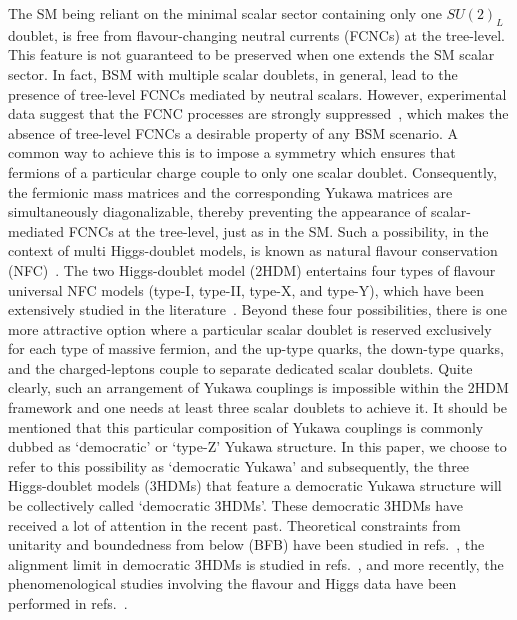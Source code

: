 \documentclass[11pt]{article}
\begin{document}
The SM being reliant on the minimal scalar sector containing only one $SU(2)_L$ doublet, is free from flavour-changing neutral currents (FCNCs) at the tree-level.  
This feature is not guaranteed to be preserved when one extends the SM scalar sector.  
In fact, BSM with multiple scalar doublets, in general, lead to the presence of tree-level FCNCs mediated by neutral scalars.  
However, experimental data suggest that the FCNC processes are strongly suppressed~\cite{Workman:2022ynf}, which makes the absence of tree-level FCNCs a desirable property of any BSM scenario.  
A common way to achieve this is to impose a symmetry which ensures that fermions of a particular charge couple to only one scalar doublet.  
Consequently, the fermionic mass matrices and the corresponding Yukawa matrices are simultaneously diagonalizable, thereby preventing the appearance of scalar-mediated FCNCs at the tree-level, just as in the SM.  
Such a possibility, in the context of multi Higgs-doublet models, is known as natural flavour conservation (NFC)~\cite{Glashow:1976nt}.  
The two Higgs-doublet model (2HDM) entertains four types of flavour universal NFC models (type-I, type-II, type-X, and type-Y), which have been extensively studied in the literature~\cite{Branco:2011iw}.  
Beyond these four possibilities, there is one more attractive option where a particular scalar doublet is reserved exclusively for each type of massive fermion, and the up-type quarks, the down-type quarks, and the charged-leptons couple to separate dedicated scalar doublets.  
Quite clearly, such an arrangement of Yukawa couplings is impossible within the 2HDM framework and one needs at least three scalar doublets to achieve it.  
It should be mentioned that this particular composition of Yukawa couplings is commonly dubbed as `democratic'\cite{Cree:2011uy} or `type-Z'\cite{Akeroyd:2016ssd} Yukawa structure.  
In this paper, we choose to refer to this possibility as `democratic Yukawa' and subsequently, the three Higgs-doublet models (3HDMs) that feature a democratic Yukawa structure will be collectively called `democratic 3HDMs'.  
These democratic 3HDMs have received a lot of attention in the recent past.  
Theoretical constraints from unitarity and boundedness from below (BFB) have been studied in refs.~\cite{Bento:2022vsb, Boto:2022uwv}, the alignment limit in democratic 3HDMs is studied in refs.~\cite{Das:2019yad, Pilaftsis:2016erj}, and more recently, the phenomenological studies involving the flavour and Higgs data have been performed in refs.~\cite{Chakraborti:2021bpy, Boto:2021qgu}.
\end{document}
